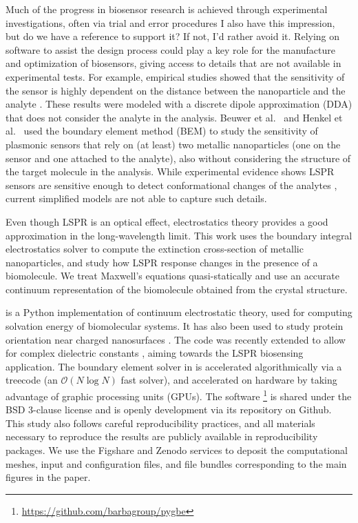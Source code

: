 Much of the progress in biosensor research is achieved 
through experimental investigations, often via trial and error procedures {\color{blue} I also have this impression, but do we have a reference to support it? If not, I'd rather avoid it}. 
Relying on software to assist the design process could play a key role for the manufacture 
and optimization of biosensors, giving access to details that are not available in experimental tests.
For example, empirical studies showed that the sensitivity of the sensor
is highly dependent on the distance between the nanoparticle and the analyte \cite{HaesETal2004}.
These results were modeled with a discrete dipole approximation (DDA) that does not consider the analyte in the analysis. 
Beuwer et al.~\cite{BeuwervanHoofZijlstra2018} and Henkel et al.~\cite{HenkelETal2018} used the boundary element method (BEM) to study the sensitivity of plasmonic sensors that rely on (at least) two metallic nanoparticles (one on the sensor and one attached to the analyte), also without considering the structure of the target molecule in the analysis.
While experimental evidence shows LSPR sensors are sensitive enough to detect 
conformational changes of the analytes \cite{HallETal2011}, 
current simplified models are not able to capture such details.


Even though LSPR is an optical effect, electrostatics theory
provides a good approximation in the long-wavelength limit. This work uses
the boundary integral electrostatics solver \pygbe \cite{CooperETal2016} 
to compute the extinction cross-section of metallic nanoparticles, and study how LSPR 
response changes in the presence of a biomolecule. 
We treat Maxwell's equations quasi-statically \cite{MayergoyzZhang2007} and
use an accurate continuum representation of the biomolecule obtained from the
crystal structure. 

\pygbe is a Python implementation of continuum electrostatic theory, used
for computing solvation energy of biomolecular systems. 
It has also been used to study protein orientation near charged nanosurfaces \cite{CooperClementiBarba2015}.
The code was recently extended to allow for complex dielectric constants 
\cite{ClementiETal2017}, aiming towards the LSPR biosensing application. 
The boundary element solver in \pygbe
is accelerated algorithmically via a treecode (an $\mathcal{O}(N\log N)$ fast solver), 
and accelerated on hardware by taking advantage of
graphic processing units (GPUs). The software
\footnote{\url{https://github.com/barbagroup/pygbe}} is shared under the 
BSD 3-clause license and is openly development via its repository on Github.
This study also follows careful reproducibility practices, and all materials necessary
to reproduce the results are publicly available in reproducibility packages.
We use the Figshare and Zenodo services to deposit the computational meshes,
input and configuration files, and file bundles corresponding to the main figures in the paper.


